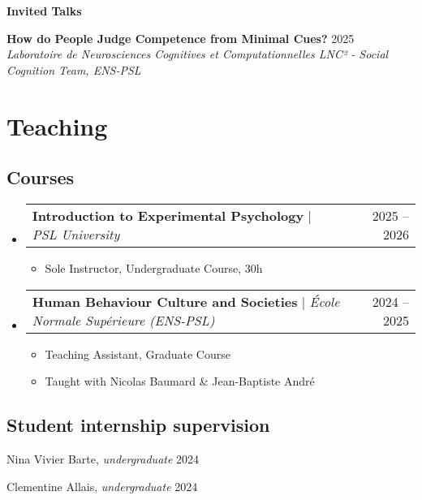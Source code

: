 \documentclass[letterpaper,11pt]{article}
\makeatletter
\newcommand{\resumeItem}[1]{
  \item\small{
    {#1 \vspace{-2pt}}
  }
}
\newcommand{\resumeItemWithYear}[3][ ]{ %
  \item\small{
    #2 \hfill {\small #3} \\
    #1
  }
}
\newcommand{\resumePublicationHeading}[1]{
  \vspace{5pt} %
  \noindent\textbf{\small #1} %
  \vspace{2pt} %
}
\newcommand{\resumeProjectHeading}[2]{
    \item
    \begin{tabular*}{0.97\textwidth}{l@{\extracolsep{\fill}}r}
      \small#1 & #2 \\
    \end{tabular*}\vspace{-7pt}
}
\newcommand{\resumeSubHeadingListStart}{\begin{itemize}[leftmargin=0.15in, label={}]}
\newcommand{\resumeSubHeadingListEnd}{\end{itemize}}
\newcommand{\resumeItemListStart}{\begin{itemize}}
\newcommand{\resumeItemListEnd}{\end{itemize}\vspace{-5pt}}
\makeatother
\begin{document}
\resumePublicationHeading{Invited Talks}
\begin{etaremune}
  \resumeItemWithYear{\textbf{How do People Judge Competence from Minimal Cues?}}{2025}{\textit{Laboratoire de Neurosciences Cognitives et Computationnelles LNC² - Social Cognition Team, ENS-PSL}}
\end{etaremune}

\section{Teaching}

\subsection*{Courses}
    \resumeSubHeadingListStart
    \resumeProjectHeading
        {\textbf{Introduction to Experimental Psychology} $|$ \emph{PSL University}}{2025 -- 2026}
        \resumeItemListStart
          \resumeItem{Sole Instructor, Undergraduate Course, 30h}
        \resumeItemListEnd
    \resumeSubHeadingListEnd
    \resumeSubHeadingListStart
      \resumeProjectHeading
          {\textbf{Human Behaviour Culture and Societies} $|$ \emph{École Normale Supérieure (ENS-PSL)}}{2024 -- 2025}
          \resumeItemListStart
            \resumeItem{Teaching Assistant, Graduate Course}
            \resumeItem{Taught with Nicolas Baumard \& Jean-Baptiste André}
          \resumeItemListEnd
    \resumeSubHeadingListEnd



\subsection*{Student internship supervision}

\begin{etaremune}
    \resumeItemWithYear{Nina Vivier Barte, \textit{undergraduate}}{2024}
    \resumeItemWithYear{Clementine Allais, \textit{undergraduate}}{2024}
\end{etaremune}
\end{document}
